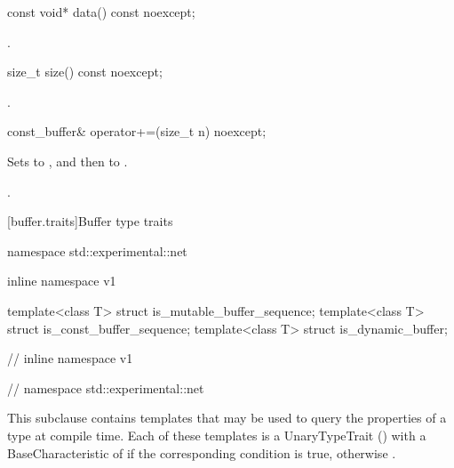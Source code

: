 %
\begin{itemdecl}
const void* data() const noexcept;
\end{itemdecl}

\begin{itemdescr}
\pnum
\returns {}.
\end{itemdescr}

%
\begin{itemdecl}
size_t size() const noexcept;
\end{itemdecl}

\begin{itemdescr}
\pnum
\returns {}.
\end{itemdescr}

%
\begin{itemdecl}
const_buffer& operator+=(size_t n) noexcept;
\end{itemdecl}

\begin{itemdescr}
\pnum
\effects Sets  to , and then  to .

\pnum
\returns {}.
\end{itemdescr}


[buffer.traits]{Buffer type traits}

%
%
%
\begin{codeblock}
namespace std::experimental::net {
inline namespace v1 {

  template<class T> struct is_mutable_buffer_sequence;
  template<class T> struct is_const_buffer_sequence;
  template<class T> struct is_dynamic_buffer;

} // inline namespace v1
} // namespace std::experimental::net
\end{codeblock}

\pnum
This subclause contains templates that may be used to query the properties of a type at compile time. Each of these templates is a UnaryTypeTrait () with a BaseCharacteristic of  if the corresponding condition is true, otherwise .

